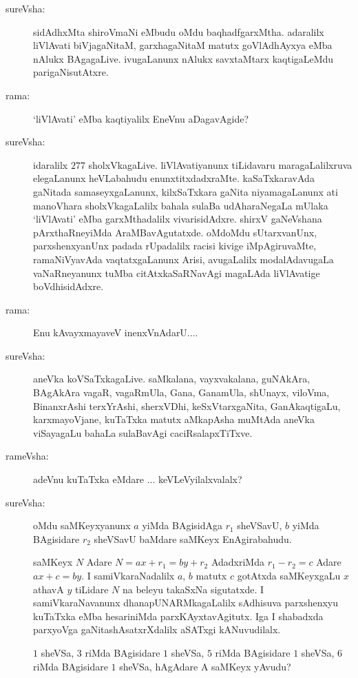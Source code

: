 \begin{description}
\item[sureVsha:] sidAdhxMta shiroVmaNi eMbudu oMdu baqhadfgarxMtha. adaralilx liVlAvati biVjagaNitaM, garxhagaNitaM matutx goVlAdhAyxya eMba nAlukx BAgagaLive. ivugaLanunx nAlukx savxtaMtarx kaqtigaLeMdu parigaNisutAtxre.

\item[rama:] `liVlAvati' eMba kaqtiyalilx EneVnu aDagavAgide?

\item[sureVsha:] idaralilx $277$ sholxVkagaLive. liVlAvatiyanunx tiLidavaru maragaLalilxruva elegaLanunx heVLabahudu enunxtitxdadxraMte. kaSaTxkaravAda gaNitada samaseyxgaLanunx, kilxSaTxkara gaNita niyamagaLanunx ati manoVhara sholxVkagaLalilx bahala sulaBa udAharaNegaLa mUlaka `liVlAvati' eMba garxMthadalilx vivarisidAdxre. shirxV gaNeVshana pArxthaRneyiMda AraMBavAgutatxde. oMdoMdu sUtarxvanUnx, parxshenxyanUnx padada rUpadalilx racisi kivige iMpAgiruvaMte, ramaNiVyavAda vaqtatxgaLanunx Arisi, avugaLalilx modalAdavugaLa vaNaRneyanunx tuMba citAtxkaSaRNavAgi magaLAda liVlAvatige boVdhisidAdxre.

\item[rama:] Enu kAvayxmayaveV inenxVnAdarU....

\item[sureVsha:] aneVka koVSaTxkagaLive. saMkalana, vayxvakalana, guNAkAra, BAgAkAra vagaR, vagaRmUla, Gana, GanamUla, shUnayx, viloVma, BinanxrAshi terxYrAshi, sherxVDhi, keSxVtarxgaNita, GanAkaqtigaLu, karxmayoVjane, kuTaTxka matutx aMkapAsha muMtAda aneVka viSayagaLu bahaLa sulaBavAgi caciRsalapxTiTxve.

\item[rameVsha:] adeVnu kuTaTxka eMdare ... keVLeVyilalxvalalx?

\item[sureVsha:] oMdu saMKeyxyanunx $a$ yiMda BAgisidAga $r_{1}$ sheVSavU, $b$ yiMda BAgisidare $r_{2}$ sheVSavU baMdare saMKeyx EnAgirabahudu.

saMKeyx $N$ Adare $N=ax+r_{1}=by+r_{2}$ AdadxriMda $r_{1}-r_{2}=c$ Adare $ax+c=by$. I samiVkaraNadalilx $a$, $b$ matutx $c$ gotAtxda saMKeyxgaLu $x$ athavA $y$ tiLidare $N$ na beleyu takaSxNa sigutatxde. I samiVkaraNavanunx dhanapUNARMkagaLalilx sAdhisuva parxshenxyu kuTaTxka eMba hesariniMda parxKAyxtavAgitutx. Iga I shabadxda parxyoVga gaNitashAsatxrXdalilx aSATxgi kANuvudilalx.

$1$ sheVSa, $3$ riMda BAgisidare $1$ sheVSa, $5$ riMda BAgisidare $1$ sheVSa, $6$ riMda BAgisidare $1$ sheVSa, hAgAdare A saMKeyx yAvudu?


\end{description}
